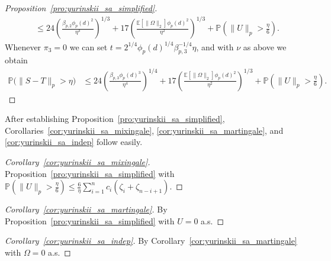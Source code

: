 \documentclass[11pt,lof]{puthesis}
\renewcommand{\P}{\ensuremath{\mathbb{P}}}
\newcommand{\E}{\ensuremath{\mathbb{E}}}
\theoremstyle{break}
\theoremstyle{proof}
\newtheorem{proof}{Proof}
\begin{document}
\begin{proof}[Proposition~\ref{pro:yurinskii_sa_simplified}]
\begin{align*}
    &\leq
    24 \left(
      \frac{\beta_{p,2} \phi_p(d)^2}{\eta^3}
    \right)^{1/3}
    + 17 \left(
      \frac{\E \left[ \|\Omega\|_2 \right] \phi_p(d)^2}{\eta^2}
    \right)^{1/3}
    +\P\left(\|U\|_p>\frac{\eta}{6}\right).
  \end{align*}
  Whenever $\pi_3 = 0$ we can set
  $t = 2^{1/4} \phi_p(d)^{1/4} \beta_{p,3}^{-1/4} \eta$,
  and with $\nu$ as above we obtain
  \begin{align*}
    \P\big(\|S-T\|_p > \eta\big)
    &\leq
    24 \left(
      \frac{\beta_{p,3} \phi_p(d)^3}{\eta^4}
    \right)^{1/4}
    + 17 \left(
      \frac{\E \left[ \|\Omega\|_2 \right] \phi_p(d)^2}{\eta^2}
    \right)^{1/3}
    +\P\left(\|U\|_p>\frac{\eta}{6}\right).
  \end{align*}
\end{proof}

After establishing Proposition~\ref{pro:yurinskii_sa_simplified},
Corollaries~\ref{cor:yurinskii_sa_mixingale},
\ref{cor:yurinskii_sa_martingale},
and \ref{cor:yurinskii_sa_indep} follow easily.

\begin{proof}[Corollary~\ref{cor:yurinskii_sa_mixingale}]
  Proposition~\ref{pro:yurinskii_sa_simplified} with
  $\P ( \|U\|_p > \frac{\eta}{6} )
  \leq \frac{6}{\eta} \sum_{i=1}^{n} c_i (\zeta_{i} + \zeta_{n-i+1})$.
\end{proof}

\begin{proof}[Corollary~\ref{cor:yurinskii_sa_martingale}]
  By Proposition~\ref{pro:yurinskii_sa_simplified}
  with $U=0$ a.s.
\end{proof}

\begin{proof}[Corollary~\ref{cor:yurinskii_sa_indep}]
  By Corollary~\ref{cor:yurinskii_sa_martingale}
  with $\Omega=0$ a.s.
\end{proof}
\end{document}
